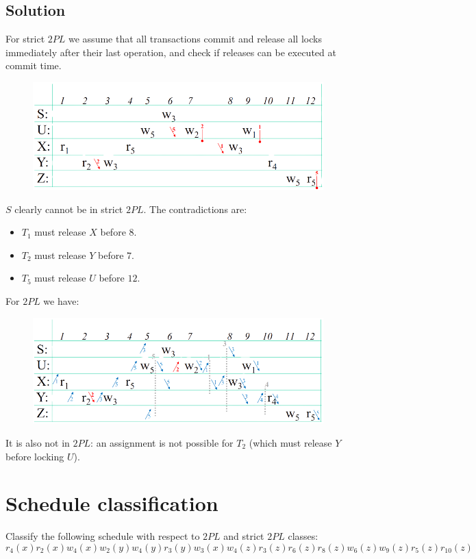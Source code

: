 \documentclass[12pt, a4paper]{report}
\newtheorem[style=M,bodystyle=\normalfont]{theorem}{Theorem}
\newtheorem[style=M,bodystyle=\normalfont]{corollary}{Corollary}
\newtheorem[style=M,bodystyle=\normalfont]{lemma}{Lemma}
\newtheorem[style=M,bodystyle=\normalfont]{definition}{Definition}
\begin{document}
    \subsection*{Solution}
        For strict $2PL$ we assume that all transactions commit and release all locks immediately after their last operation, and check if releases can be executed at commit time.
        \begin{figure}[H]
            \centering
            \includegraphics[width=1\linewidth]{images/2PL1.png}
        \end{figure}
        $S$ clearly cannot be in strict $2PL$. The contradictions are:
        \begin{itemize}
            \item $T_1$ must release $X$ before $8$. 
            \item $T_2$ must release $Y$ before $7$.
            \item $T_5$ must release $U$ before $12$.
        \end{itemize}
        For $2PL$ we have: 
        \begin{figure}[H]
            \centering
            \includegraphics[width=1\linewidth]{images/2PL2.png}
        \end{figure}
        It is also not in $2PL$: an assignment is not possible for $T_2$ (which must release $Y$ before locking $U$).

    \newpage

    \section{Schedule classification}
        Classify the following schedule with respect to $2PL$ and strict $2PL$ classes: 
        \[r_4(x) r_2(x) w_4(x) w_2(y) w_4(y) r_3(y) w_3(x) w_4(z) r_3(z) r_6(z) r_8(z) w_6(z) w_9(z) r_5(z) r_10(z)\]
\end{document}
